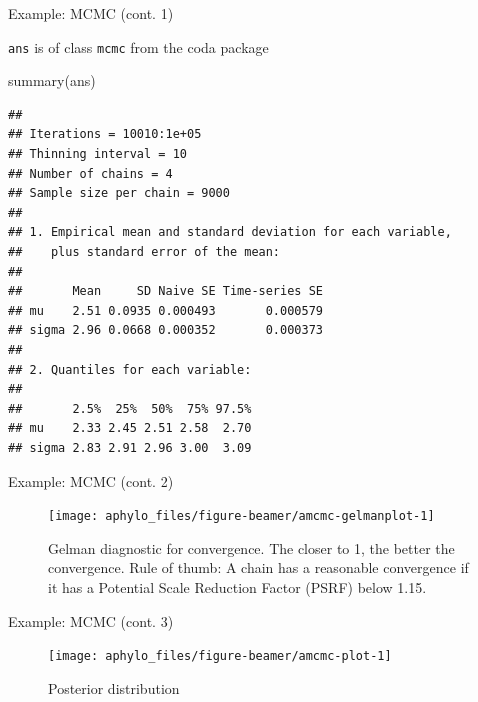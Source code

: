 \documentclass[9pt,ignorenonframetext,]{beamer}
\newenvironment{Shaded}{\begin{snugshade}}{\end{snugshade}}
\newcommand{\KeywordTok}[1]{\textcolor[rgb]{0.94,0.87,0.69}{#1}}
\newcommand{\NormalTok}[1]{\textcolor[rgb]{0.80,0.80,0.80}{#1}}
\begin{document}
\begin{frame}[fragile,t]{Example: MCMC (cont. 1)}

\texttt{ans} is of class \texttt{mcmc} from the coda package

\footnotesize

\begin{Shaded}
\begin{Highlighting}[]
\KeywordTok{summary}\NormalTok{(ans)}
\end{Highlighting}
\end{Shaded}

\begin{verbatim}
## 
## Iterations = 10010:1e+05
## Thinning interval = 10 
## Number of chains = 4 
## Sample size per chain = 9000 
## 
## 1. Empirical mean and standard deviation for each variable,
##    plus standard error of the mean:
## 
##       Mean     SD Naive SE Time-series SE
## mu    2.51 0.0935 0.000493       0.000579
## sigma 2.96 0.0668 0.000352       0.000373
## 
## 2. Quantiles for each variable:
## 
##       2.5%  25%  50%  75% 97.5%
## mu    2.33 2.45 2.51 2.58  2.70
## sigma 2.83 2.91 2.96 3.00  3.09
\end{verbatim}

\normalsize

\end{frame}

\begin{frame}[t]{Example: MCMC (cont. 2)}

\footnotesize

\begin{figure}

{\centering \texttt{[image: aphylo\_files/figure-beamer/amcmc-gelmanplot-1]} 

}

\caption{Gelman diagnostic for convergence. The closer to 1, the better the convergence. Rule of thumb: A chain has a reasonable convergence if it has a Potential Scale Reduction Factor (PSRF) below 1.15.}\label{fig:amcmc-gelmanplot}
\end{figure}

\normalsize

\end{frame}

\begin{frame}[t]{Example: MCMC (cont. 3)}

\footnotesize

\begin{figure}

{\centering \texttt{[image: aphylo\_files/figure-beamer/amcmc-plot-1]} 

}

\caption{Posterior distribution}\label{fig:amcmc-plot}
\end{figure}

\normalsize

\end{frame}
\end{document}
